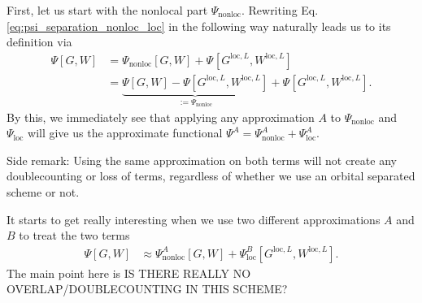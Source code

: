 \documentclass[12pt,a4paper]{scrartcl}
\numberwithin{equation}{section}
\newcommand{\cng}[1]{{\color{red}#1}}
\begin{document}
\bigskip

First, let us start with the nonlocal part $\Psi_{\mathrm{nonloc}}$.
Rewriting Eq. \eqref{eq:psi_separation_nonloc_loc} in the following way naturally
leads us to its definition via
\begin{align}
 \Psi[G,W] &= \Psi_{\mathrm{nonloc}}[G,W] + \Psi_{}[G^{\mathrm{loc},L},W^{\mathrm{loc},L}] \\
 &= \underbrace{\Psi[G,W]- \Psi[G^{\mathrm{loc},L},W^{\mathrm{loc},L}]}_{:=\Psi_{\mathrm{nonloc}}}
    + \Psi_{}[G^{\mathrm{loc},L},W^{\mathrm{loc},L}].
\end{align}
By this, we immediately see that applying any approximation $A$ to $\Psi_{\mathrm{nonloc}}$ and $\Psi_{\mathrm{loc}}$
will give us the approximate functional $\Psi^A = \Psi^A_{\mathrm{nonloc}}+\Psi^A_{\mathrm{loc}}$.

\bigskip

Side remark: Using the same approximation on both terms will not create any doublecounting or loss
of terms, regardless of whether we use an orbital separated scheme or not.

\bigskip

It starts to get really interesting when we use two different approximations $A$ and $B$
to treat the two terms
\begin{align}
\Psi[G,W] &\approx \Psi^A_{\mathrm{nonloc}}[G,W] + \Psi^B_{\mathrm{loc}}[G^{\mathrm{loc},L},W^{\mathrm{loc},L}] .
\end{align}
The main point here is \cng{IS THERE REALLY NO OVERLAP/DOUBLECOUNTING IN THIS SCHEME?}

\bigskip
\end{document}
